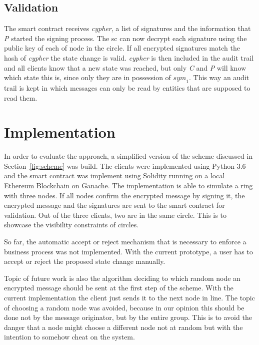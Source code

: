 \documentclass[runningheads]{llncs}
\newcommand{\ber}[1]{\textit{#1}}
\newcommand{\refsec}[1]{Section~\ref{#1}}
\begin{document}
\subsection{Validation} \label{subsec:furtherinfo}

The smart contract receives \ber{cypher}, a list of signatures and the information that \ber{P} started the signing process. The sc can now decrypt each signature using the public key of each of node in the circle. If all encrypted signatures match the hash of \ber{cypher} the state change is valid. \ber{cypher} is then included in the audit trail and all clients know that a new state was reached, but only \ber{C} and \ber{P} will know which state this is, since only they are in possession of ${sym}_1$. This way an audit trail is kept in which messages can only be read by entities that are supposed to read them.


\section{Implementation} \label{sec:eval}


In order to evaluate the approach, a simplified version of the scheme discussed in \refsec{fig:scheme} was build. The clients were implemented using Python 3.6 and the smart contract was implement using Solidity running on a local Ethereum Blockchain on Ganache. The implementation is able to simulate a ring with three nodes. If all nodes confirm the encrypted message by signing it, the encrypted message and the signatures are sent to the smart contract for validation. Out of the three clients, two are in the same circle. This is to showcase the visibility constraints of circles. 

So far, the automatic accept or reject mechanism that is necessary to enforce a business process was not implemented. With the current prototype, a user has to accept or reject the proposed state change manually. 

Topic of future work is also the algorithm deciding to which random node an encrypted message should be sent at the first step of the scheme. With the current implementation the client just sends it to the next node in line. The topic of choosing a random node was avoided, because in our opinion this should be done not by the message originator, but by the entire group. This is to avoid the danger that a node might choose a different node not at random but with the intention to somehow cheat on the system.
\end{document}

